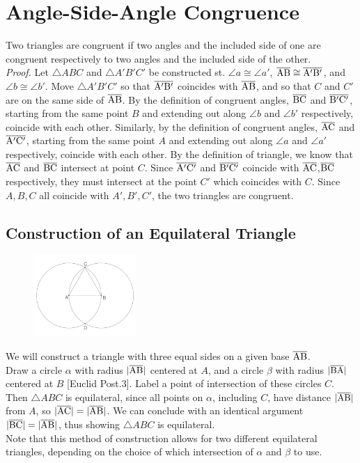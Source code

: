\documentclass{report}
\begin{document}
\section{Angle-Side-Angle Congruence}
\label{sec:ASA}
Two triangles are congruent if two angles and the included side of one are congruent respectively to two angles and the included side of the other.
\\[\baselineskip] \textit{Proof.} Let $\triangle{ABC}$ and $\triangle{A'B'C'}$ be constructed st. $\angle a \cong \angle a'$, $\overline{\rm AB} \cong \overline{\rm A'B'}$, and $\angle b \cong \angle b'$. Move $\triangle{A'B'C'}$ so that $\overline{\rm A'B'}$ coincides with $\overline{\rm AB}$, and so that $C$ and $C'$ are on the same side of $\overline{\rm AB}$. By the definition of congruent angles, $\overline{\rm BC}$ and $\overline{\rm B'C'}$, starting from the same point $B$ and extending out along $\angle b$ and $\angle b'$ respectively, coincide with each other. Similarly, by the definition of congruent angles, $\overline{\rm AC}$ and $\overline{\rm A'C'}$, starting from the same point $A$ and extending out along $\angle a$ and $\angle a'$ respectively, coincide with each other. By the definition of triangle, we know that $\overline{\rm AC}$ and $\overline{\rm BC}$ intersect at point $C$. Since $\overline{\rm A'C'}$ and $\overline{\rm B'C'}$ coincide with $\overline{\rm AC}$,$\overline{\rm BC}$ respectively, they must intersect at the point $C'$ which coincides with $C$. Since $A, B, C$ all coincide with $A', B', C'$, the two triangles are congruent.
\subsection{Construction of an Equilateral Triangle}
\label{sec:EQT}
\begin{figure} %
    \centering
    \includegraphics[width=0.35\textwidth]{eqtri}
\end{figure}
We will construct a triangle with three equal sides on a given base $\overline{\rm AB}$.
\\[\baselineskip]
Draw a circle $\alpha$ with radius $|\overline{\rm AB}|$ centered at $A$, and a circle $\beta$ with radius $|\overline{\rm BA}|$ centered at $B$ [Euclid Post.\@ 3]. Label a point of intersection of these circles $C$. Then $\triangle{ABC}$ is equilateral, since all points on $\alpha$, including $C$, have distance $|\overline{\rm AB}|$ from $A$, so $|\overline{\rm AC}|= |\overline{\rm AB}|$. We can conclude with an identical argument $|\overline{\rm BC}|= |\overline{\rm AB}|$, thus showing $\triangle{ABC}$ is equilateral.
\\Note that this method of construction allows for two different equilateral triangles, depending on the choice of which intersection of $\alpha$ and $\beta$ to use.
\end{document}
